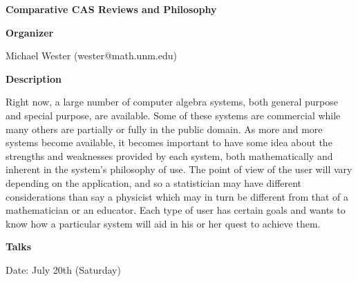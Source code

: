 \begin{center}
{\LARGE \bf Comparative CAS Reviews and Philosophy
}
\end{center}
\bigskip

\noindent
{\bf Organizer}
\medskip

Michael Wester (wester@math.unm.edu)

\bigskip

\noindent
{\bf Description}
\medskip

Right now, a large number of computer algebra systems, both general purpose and special purpose,
are available. Some of these systems are commercial while many others are partially or fully in the
public domain. As more and more systems become available, it becomes important to have some
idea about the strengths and weaknesses provided by each system, both mathematically and
inherent in the system's philosophy of use. The point of view of the user will vary depending on
the application, and so a statistician may have different considerations than say a physicist which
may in turn be different from that of a mathematician or an educator. Each type of user has certain
goals and wants to know how a particular system will aid in his or her quest to achieve them. 

\bigskip
\noindent
{\bf Talks}
\medskip

Date: July 20th (Saturday) 

